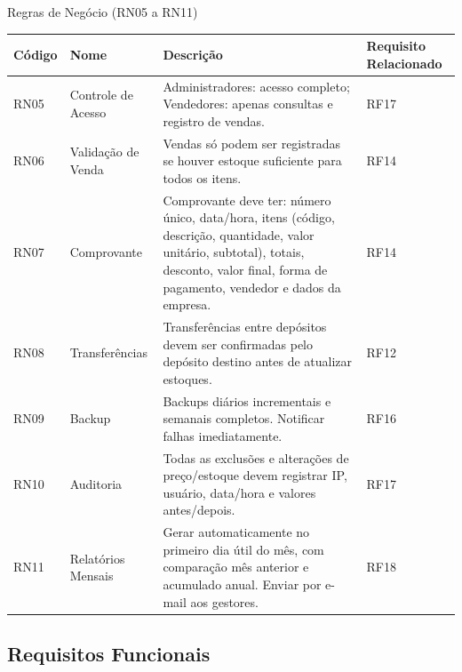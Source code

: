 \documentclass[
	12pt,				%
	openany,			%
	twoside,			%
	a4paper,			%
	english,			%
	brazil				%
	]{abntex2}
\begin{document}
\FloatBarrier


\begin{quadro}[htb]
\caption{\label{quadro_rn2}Regras de Negócio (RN05 a RN11)}
\hspace*{-1cm}
\begin{tabular}{|p{1.6cm}|p{4.0cm}|p{7.5cm}|p{2.0cm}|}
    \hline
    \textbf{Código} & \textbf{Nome} & \textbf{Descrição} & \textbf{Requisito Relacionado} \\ \hline

 

    RN05 & Controle de Acesso & Administradores: acesso completo; Vendedores: apenas consultas e registro de vendas. & RF17 \\ \hline

    RN06 & Validação de Venda & Vendas só podem ser registradas se houver estoque suficiente para todos os itens. & RF14 \\ \hline

    RN07 & Comprovante & Comprovante deve ter: número único, data/hora, itens (código, descrição, quantidade, valor unitário, subtotal), totais, desconto, valor final, forma de pagamento, vendedor e dados da empresa. & RF14 \\ \hline

    RN08 & Transferências & Transferências entre depósitos devem ser confirmadas pelo depósito destino antes de atualizar estoques. & RF12 \\ \hline

    RN09 & Backup & Backups diários incrementais e semanais completos. Notificar falhas imediatamente. & RF16 \\ \hline

    RN10 & Auditoria & Todas as exclusões e alterações de preço/estoque devem registrar IP, usuário, data/hora e valores antes/depois. & RF17 \\ \hline

    RN11 & Relatórios Mensais & Gerar automaticamente no primeiro dia útil do mês, com comparação mês anterior e acumulado anual. Enviar por e-mail aos gestores. & RF18 \\ \hline

\end{tabular}
\end{quadro}

\FloatBarrier




\subsection{Requisitos Funcionais}
\end{document}
